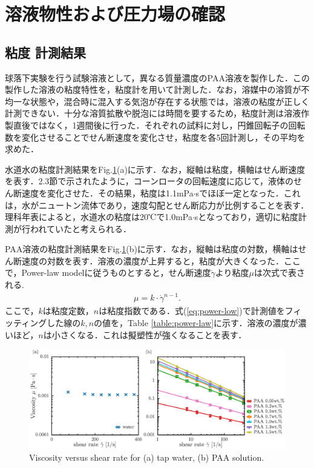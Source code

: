 \section{溶液物性および圧力場の確認}
\subsection{粘度 計測結果}
球落下実験を行う試験溶液として，異なる質量濃度のPAA溶液を製作した．この製作した溶液の粘度特性を，粘度計を用いて計測した．なお，溶媒中の溶質が不均一な状態や，混合時に混入する気泡が存在する状態では，溶液の粘度が正しく計測できない．十分な溶質拡散や脱泡には時間を要するため，粘度計測は溶液作製直後ではなく，1週間後に行った．それぞれの試料に対し，円錐回転子の回転数を変化させることでせん断速度を変化させ，粘度を各5回計測し，その平均を求めた．

水道水の粘度計測結果をFig.\ref{fig:vis}(a)に示す．なお，縦軸は粘度，横軸はせん断速度を表す．2.3節で示されたように，コーンロータの回転速度に応じて，液体のせん断速度を変化させた．その結果，粘度は1.1mPa$\cdot$sでほぼ一定となった．これは，水がニュートン流体であり，速度勾配とせん断応力が比例することを表す．理科年表\cite{理科年表}によると，水道水の粘度は20℃で1.0mPa$\cdot$sとなっており，適切に粘度計測が行われていたと考えられる．

PAA溶液の粘度計測結果をFig.\ref{fig:vis}(b)に示す．なお，縦軸は粘度の対数，横軸はせん断速度の対数を表す．溶液の濃度が上昇すると，粘度が大きくなった．ここで，Power-law modelに従うものとすると，せん断速度$\dot{\gamma}$より粘度$\mu$は次式で表される\cite{ref:1}.
\begin{eqnarray}
	\label{eq:power-low}
	\mu=k\cdot\dot{\gamma}^{n-1} .
\end{eqnarray}
ここで，$k$は粘度定数，$n$は粘度指数である．式(\ref{eq:power-low})で計測値をフィッティングした線の$k,n$の値を，Table \ref{table:power-law}に示す．溶液の濃度が濃いほど，$n$は小さくなる．これは擬塑性が強くなることを表す．

\begin{figure}[ht]
	\centering
	\includegraphics[width=1\textwidth]{3-Physical_Property/viscosity.eps}
	\caption{Viscosity versus shear rate for (a) tap water, (b) PAA solution.}
	\label{fig:vis}
\end{figure}

